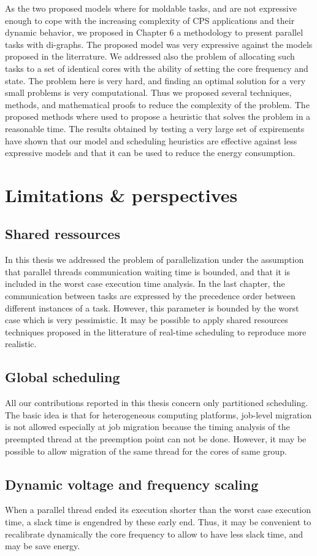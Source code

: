 As the two proposed models where for moldable tasks, and are not
expressive enough to cope with the increasing complexity of CPS
applications and their dynamic behavior, we proposed in Chapter 6 a
methodology to present parallel tasks with di-graphs. The proposed
model was very expressive against the models proposed in the
literrature. We addressed also the problem of allocating such tasks to
a set of identical cores with the ability of setting the core
frequency and state. The problem here is very hard, and finding an
optimal solution for a very small problems is very computational. Thus
we proposed several techniques, methods, and mathematical proofs to
reduce the complexity of the problem. The proposed methods where used
to propose a heuristic that solves the problem in a reasonable
time. The results obtained by testing a very large set of expirements
have shown that our model and scheduling heuristics are effective
against less expressive models and that it can be used to reduce the
energy consumption.
\section*{Limitations \& perspectives}
\subsection*{Shared ressources}
In this thesis we addressed the problem of parallelization under the
assumption that parallel threads communication waiting time is
bounded, and that it is included in the worst case execution time
analysis. In the last chapter, the communication between tasks are
expressed by the precedence order between different instances of a
task. However, this parameter is bounded by the worst case which is
very pessimistic. It may be possible to apply shared resources
techniques proposed in the litterature of real-time scheduling to
reproduce more realistic.
\subsection*{Global scheduling}
All our contributions reported in this thesis concern only partitioned
scheduling. The basic idea is that for heterogeneous computing
platforms, job-level migration is not allowed especially at job
migration because the timing analysis of the preempted thread at the
preemption point can not be done. However, it may be possible to allow
migration of the same thread for the cores of same group.

\subsection*{Dynamic voltage and frequency scaling}
When a parallel thread ended its execution shorter than the worst case
execution time, a slack time is engendred by these early end. Thus, it
may be convenient to recalibrate dynamically the core frequency to
allow to have less slack time, and may be save energy.

